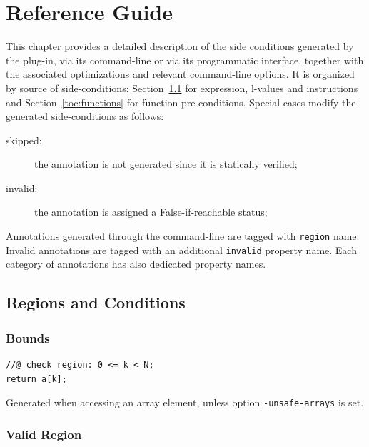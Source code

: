 \chapter{Reference Guide}
\label{toc:reference}

This chapter provides a detailed description of the side conditions generated by
the \Region plug-in, via its command-line or via its programmatic interface,
together with the associated optimizations and relevant command-line options. It
is organized by source of side-conditions: Section~\ref{toc:code} for
expression, l-values and \C instructions and Section~\ref{toc:functions} for
function pre-conditions. Special cases modify the generated side-conditions as
follows:
\begin{description}
  \item[skipped:] the annotation is not generated since it is statically verified;
  \item[invalid:] the annotation is assigned a False-if-reachable status;
\end{description}

Annotations generated through the command-line are tagged with \verb"region"
name. Invalid annotations are tagged with an additional \verb"invalid" property
name. Each category of annotations has also dedicated property names.

\section{Regions and Conditions}
\label{toc:code}

\subsection{Bounds}

\begin{lstlisting}
//@ check region: 0 <= k < N;
return a[k];
\end{lstlisting}

\noindent
Generated when accessing an array element, unless option \verb+-unsafe-arrays+
is set.

\subsection{Valid Region}

